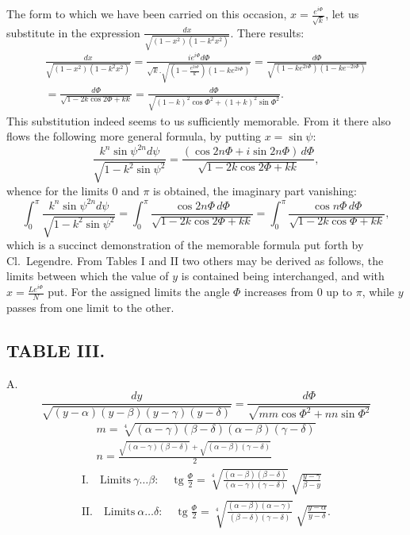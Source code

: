 \documentclass{article}
\begin{document}
The form to which we have been carried on this occasion, $x=\frac{e^{i\Phi}}{\sqrt{k}}$, let us substitute in the expression $\frac{dx}{\sqrt{(1-x^{2})(1-k^{2}x^{2})}}$. There results:
\[
\begin{gathered}
\frac{dx}{\sqrt{(1-x^{2})(1-k^{2}x^{2})}}=\frac{i e^{i\Phi}d\Phi}{\sqrt{k}.\sqrt{\left(1-\frac{e^{2i\Phi}}{k}\right)\left(1-ke^{2i\Phi}\right)}}=\frac{d\Phi}{\sqrt{\left(1-ke^{2i\Phi}\right)\left(1-ke^{-2i\Phi}\right)}}\\
=\frac{d\Phi}{\sqrt{1-2k\cos2\Phi+kk}}=\frac{d\Phi}{\sqrt{(1-k)^{2}\cos\Phi^{2}+(1+k)^{2}\sin\Phi^{2}}}.
\end{gathered}
\]
This substitution indeed seems to us sufficiently memorable. From it there also flows the following more general formula, by putting $x=\sin\psi$:
\[
\frac{k^{n}\sin\psi^{2n}d\psi}{\sqrt{1-k^{2}\sin\psi^{2}}}=\frac{(\cos2n\Phi+i\sin2n\Phi)\,d\Phi}{\sqrt{1-2k\cos2\Phi+kk}},
\]
whence for the limits $0$ and $\pi$ is obtained, the imaginary part vanishing:
\[
\int_{0}^{\pi}\frac{k^{n}\sin\psi^{2n}d\psi}{\sqrt{1-k^{2}\sin\psi^{2}}}=\int_{0}^{\pi}\frac{\cos2n\Phi\,d\Phi}{\sqrt{1-2k\cos2\Phi+kk}}=\int_{0}^{\pi}\frac{\cos n\Phi\,d\Phi}{\sqrt{1-2k\cos\Phi+kk}},
\]
which is a succinct demonstration of the memorable formula put forth by Cl.\ Legendre. From Tables I and II two others may be derived as follows, the limits between which the value of $y$ is contained being interchanged, and with $x=\frac{Le^{i\Phi}}{N}$ put. For the assigned limits the angle $\Phi$ increases from $0$ up to $\pi$, while $y$ passes from one limit to the other.


\subsection*{TABLE III.}

A.
\[
\frac{dy}{\sqrt{(y-\alpha)(y-\beta)(y-\gamma)(y-\delta)}}=\frac{d\Phi}{\sqrt{mm\cos\Phi^{2}+nn\sin\Phi^{2}}}
\]
\[
\begin{gathered}
m=\sqrt[4]{(\alpha-\gamma)(\beta-\delta)(\alpha-\beta)(\gamma-\delta)}\\
n=\frac{\sqrt{(\alpha-\gamma)(\beta-\delta)}+\sqrt{(\alpha-\beta)(\gamma-\delta)}}{2}
\end{gathered}
\]
\[
\begin{gathered}
\text{I.}\quad\text{Limits}\ \gamma\ldots\beta:\quad\operatorname{tg}\frac{\Phi}{2}=\sqrt[4]{\frac{(\alpha-\beta)(\beta-\delta)}{(\alpha-\gamma)(\gamma-\delta)}}\ \sqrt{\frac{y-\gamma}{\beta-y}}\\
\text{II.}\quad\text{Limits}\ \alpha\ldots\delta:\quad\operatorname{tg}\frac{\Phi}{2}=\sqrt[4]{\frac{(\alpha-\beta)(\alpha-\gamma)}{(\beta-\delta)(\gamma-\delta)}}\ \sqrt{\frac{y-\alpha}{y-\delta}}.
\end{gathered}
\]
\end{document}
